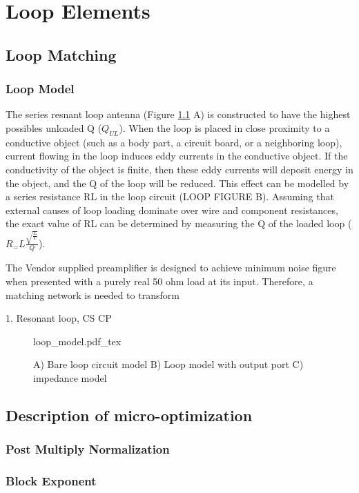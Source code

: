 \chapter{Loop Elements}

\section{Loop Matching}
\subsection{Loop Model}

The series resnant loop antenna (Figure \ref{fig:loop_model} A) is constructed to have the highest possibles unloaded Q
($Q_{UL}$). When the loop is placed in close proximity to a conductive object (such as a body part, a circuit board, or
a neighboring loop), current flowing in the loop induces eddy currents in the conductive object. If the conductivity of
the object is finite, then these eddy currents will deposit energy in the object, and the Q of the loop will be reduced.
This effect can be modelled by a series resistance RL in the loop circuit (LOOP FIGURE B). Assuming that external causes
of loop loading dominate over wire and component resistances, the exact value of RL can be determined by measuring the Q
of the loaded loop ($R_=L\frac{\sqrt{\frac{L}{C}}}{Q}$).

The Vendor supplied preamplifier is designed to achieve minimum noise figure when presented with a purely real 50 ohm
load at its input. Therefore, a matching network is needed to transform 

1. Resonant loop, CS CP

\begin{figure}
\vspace{2.4in}
{loop_model.pdf_tex}
    \caption{A) Bare loop circuit model B) Loop model with output port C) impedance model}
\label{fig:loop_model}
\end{figure}

\section{Description of micro-optimization}\label{ch1:opts}
\subsection{Post Multiply Normalization}
%
\subsection{Block Exponent}

